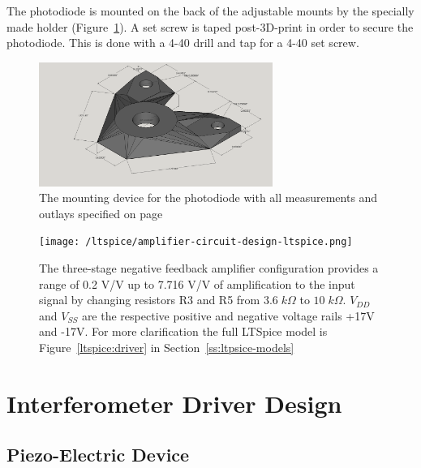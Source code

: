 \documentclass[12pt,journal]{IEEEtran}
\begin{document}
The photodiode is mounted on the back of the adjustable mounts by the specially made holder (Figure~\ref{fig:diode_holder}). A set screw is taped post-3D-print in order to secure the photodiode. This is done with a 4-40 drill and tap for a 4-40 set screw. 

\begin{figure}[h!]
  \centering
	\includegraphics[width=3in]{./mechanical/diode_holder_3d_rep.png}
	\caption[Cavity Mounts]{The mounting device for the photodiode with all measurements and outlays specified on page~\pageref{ss:diode_holder}}
	\label{fig:diode_holder}
\end{figure}

\begin{figure}[tb]
  \centering
	\texttt{[image: /ltspice/amplifier-circuit-design-ltspice.png]}
	\caption[Cavity Mounts]{The three-stage negative feedback amplifier configuration provides a range of 0.2 V/V up to 7.716 V/V of amplification to the input signal by changing resistors R3 and R5 from $3.6\;k\Omega$ to $10\;k\Omega$. $V_{DD}$ and $V_{SS}$ are the respective positive and negative voltage rails +17V and -17V. For more clarification the full LTSpice model is Figure~\ref{ltspice:driver} in Section~\ref{ss:ltpsice-models}}
	\label{fig:amplifier-configuration}
\end{figure}



\section{Interferometer Driver Design}


\subsection{Piezo-Electric Device}
\end{document}

